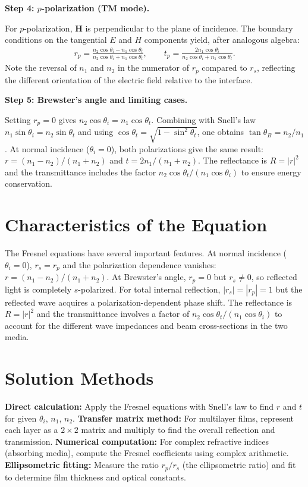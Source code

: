 \textbf{Step 4: $p$-polarization (TM mode).}

For $p$-polarization, $\mathbf{H}$ is perpendicular to the plane of incidence. The boundary conditions on the tangential $E$ and $H$ components yield, after analogous algebra:
\begin{align}
r_p = \frac{n_2\cos\theta_i - n_1\cos\theta_t}{n_2\cos\theta_i + n_1\cos\theta_t}, \qquad t_p = \frac{2n_1\cos\theta_i}{n_2\cos\theta_i + n_1\cos\theta_t}.
\end{align}
Note the reversal of $n_1$ and $n_2$ in the numerator of $r_p$ compared to $r_s$, reflecting the different orientation of the electric field relative to the interface.

\textbf{Step 5: Brewster's angle and limiting cases.}

Setting $r_p = 0$ gives $n_2\cos\theta_i = n_1\cos\theta_t$. Combining with Snell's law $n_1\sin\theta_i = n_2\sin\theta_t$ and using $\cos\theta_t = \sqrt{1 - \sin^2\theta_t}$, one obtains $\tan\theta_B = n_2/n_1$. At normal incidence ($\theta_i = 0$), both polarizations give the same result: $r = (n_1 - n_2)/(n_1 + n_2)$ and $t = 2n_1/(n_1 + n_2)$. The reflectance is $R = |r|^2$ and the transmittance includes the factor $n_2\cos\theta_t/(n_1\cos\theta_i)$ to ensure energy conservation.

\section*{Characteristics of the Equation}

The Fresnel equations have several important features. At normal incidence ($\theta_i = 0$), $r_s = r_p$ and the polarization dependence vanishes: $r = (n_1 - n_2)/(n_1 + n_2)$. At Brewster's angle, $r_p = 0$ but $r_s \neq 0$, so reflected light is completely $s$-polarized. For total internal reflection, $|r_s| = |r_p| = 1$ but the reflected wave acquires a polarization-dependent phase shift. The reflectance is $R = |r|^2$ and the transmittance involves a factor of $n_2\cos\theta_t/(n_1\cos\theta_i)$ to account for the different wave impedances and beam cross-sections in the two media.
\section*{Solution Methods}

\textbf{Direct calculation:} Apply the Fresnel equations with Snell's law to find $r$ and $t$ for given $\theta_i$, $n_1$, $n_2$. \textbf{Transfer matrix method:} For multilayer films, represent each layer as a $2\times 2$ matrix and multiply to find the overall reflection and transmission. \textbf{Numerical computation:} For complex refractive indices (absorbing media), compute the Fresnel coefficients using complex arithmetic. \textbf{Ellipsometric fitting:} Measure the ratio $r_p/r_s$ (the ellipsometric ratio) and fit to determine film thickness and optical constants.
